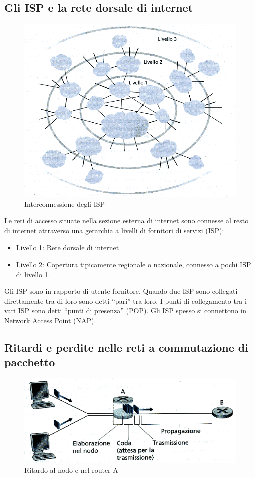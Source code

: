 \documentclass[11pt,a4paper]{article}
\begin{document}
\subsection{Gli ISP e la rete dorsale di internet}
\begin{figure}
	\includegraphics[scale=0.6]{img/006.png}
	\caption{Interconnessione degli ISP}
\end{figure}
Le reti di accesso situate nella sezione esterna di internet sono connesse al resto di internet attraverso una gerarchia a livelli di fornitori di servizi (ISP):
\begin{itemize}
	\item Livello 1: Rete dorsale di internet
	\item Livello 2: Copertura tipicamente regionale o nazionale, connesso a pochi ISP di livello 1.
\end{itemize}
Gli ISP sono in rapporto di utente-fornitore.
Quando due ISP sono collegati direttamente tra di loro sono detti “pari” tra loro.
I punti di collegamento tra i vari ISP sono detti “punti di presenza” (POP).
Gli ISP spesso si connettono in Network Access Point (NAP).

\subsection{Ritardi e perdite nelle reti a commutazione di pacchetto}
\begin{figure}
	\begin{center}
		\includegraphics[scale=0.6]{img/007.png}
		\caption{Ritardo al nodo e nel router A}
	\end{center}
\end{figure}
\end{document}
